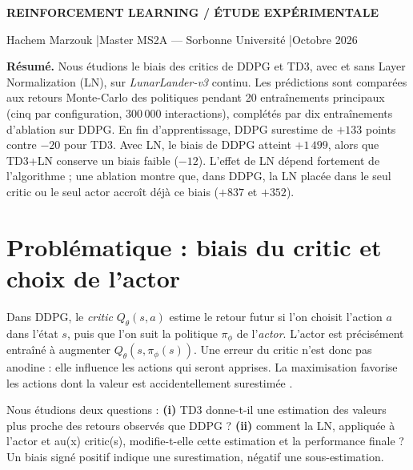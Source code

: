 \documentclass[10pt,a4paper]{article}
\begin{document}
\thispagestyle{empty}
\vspace*{-9mm}
{\sffamily\footnotesize\bfseries\color{accent} REINFORCEMENT LEARNING \quad / \quad ÉTUDE EXPÉRIMENTALE}\par
\vspace{5pt}
\par
\vspace{5pt}
{\sffamily\small Hachem Marzouk \quad\textcolor{rulegray}{|}\quad Master MS2A — Sorbonne Université \quad\textcolor{rulegray}{|}\quad Octobre 2026}\par
\vspace{7pt}
\noindent{\color{accent}\rule{\linewidth}{1.15pt}}\par
\vspace{5pt}
\noindent\textbf{Résumé.} Nous étudions le biais des critics de DDPG et TD3, avec et sans Layer Normalization (LN), sur \emph{LunarLander-v3} continu. Les prédictions sont comparées aux retours Monte-Carlo des politiques pendant 20 entraînements principaux (cinq par configuration, 300\,000 interactions), complétés par dix entraînements d'ablation sur DDPG. En fin d'apprentissage, DDPG surestime de $+133$ points contre $-20$ pour TD3. Avec LN, le biais de DDPG atteint $+1\,499$, alors que TD3+LN conserve un biais faible ($-12$). L'effet de LN dépend fortement de l'algorithme ; une ablation montre que, dans DDPG, la LN placée dans le seul critic ou le seul actor accroît déjà ce biais ($+837$ et $+352$).\par
\vspace{4pt}
\section{Problématique : biais du critic et choix de l’actor}
Dans DDPG, le \emph{critic} $Q_\theta(s,a)$ estime le retour futur si l'on choisit l'action $a$ dans l'état $s$, puis que l'on suit la politique $\pi_\phi$ de l'\emph{actor}. L'actor est précisément entraîné à augmenter $Q_\theta(s,\pi_\phi(s))$. Une erreur du critic n'est donc pas anodine : elle influence les actions qui seront apprises. La maximisation favorise les actions dont la valeur est accidentellement surestimée \cite{fujimoto2018,vanhasselt2010}.

Nous étudions deux questions : \textbf{(i)} TD3 donne-t-il une estimation des valeurs plus proche des retours observés que DDPG ? \textbf{(ii)} comment la LN, appliquée à l'actor et au(x) critic(s), modifie-t-elle cette estimation et la performance finale ? Un biais signé positif indique une surestimation, négatif une sous-estimation.
\end{document}
